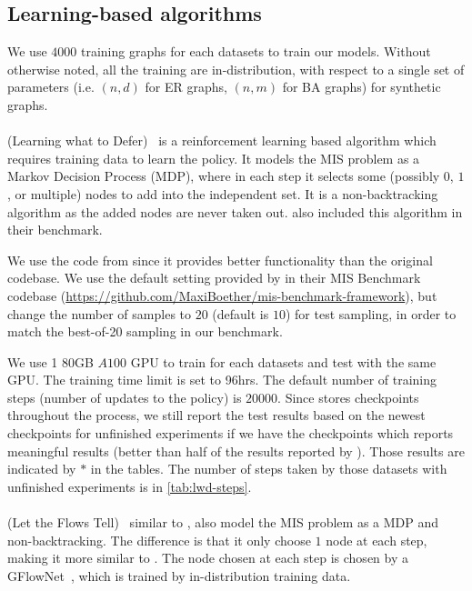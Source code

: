 \subsection{Learning-based algorithms}
We use $4000$ training graphs for each datasets to train our models. Without otherwise noted, all the training are in-distribution, with respect to a single set of parameters (i.e. $(n,d)$ for ER graphs, $(n,m)$ for BA graphs) for synthetic graphs.

\paragraph{\lwd}
\lwd(Learning what to Defer)~\citep{ahn2020learning} is a reinforcement learning based algorithm which requires training data to learn the policy. It models the MIS problem as a Markov Decision Process (MDP), where in each step it selects some (possibly $0$, $1$, or multiple) nodes to add into the independent set. It is a non-backtracking algorithm as the added nodes are never taken out. \citet{boether_dltreesearch_2022} also included this algorithm in their benchmark.

We use the code from \citet{boether_dltreesearch_2022} since it provides better functionality than the original codebase. We use the default setting provided by \citet{boether_dltreesearch_2022} in their MIS Benchmark codebase (\url{https://github.com/MaxiBoether/mis-benchmark-framework}), but change the number of samples to $20$ (default is $10$) for test sampling, in order to match the best-of-20 sampling in our benchmark.

We use 1 80GB $A100$ GPU to train for each datasets and test with the same GPU. The training time limit is set to 96hrs. The default number of training steps (number of updates to the policy) is $20000$. Since \lwd stores checkpoints throughout the process, we still report the test results based on the newest checkpoints for unfinished experiments if we have the checkpoints which reports meaningful results (better than half of the results reported by \deggreedy). Those results are indicated by $*$ in the tables. The number of steps taken by those datasets with unfinished experiments is in \cref{tab:lwd-steps}.


\paragraph{\gflownets}
\gflownets(Let the Flows Tell)~\citep{zhang2023let} similar to \lwd, also model the MIS problem as a MDP and non-backtracking. The difference is that it only choose $1$ node at each step, making it more similar to \deggreedy. The node chosen at each step is chosen by a GFlowNet~\citep{bengio2021flow}, which is trained by in-distribution training data.

